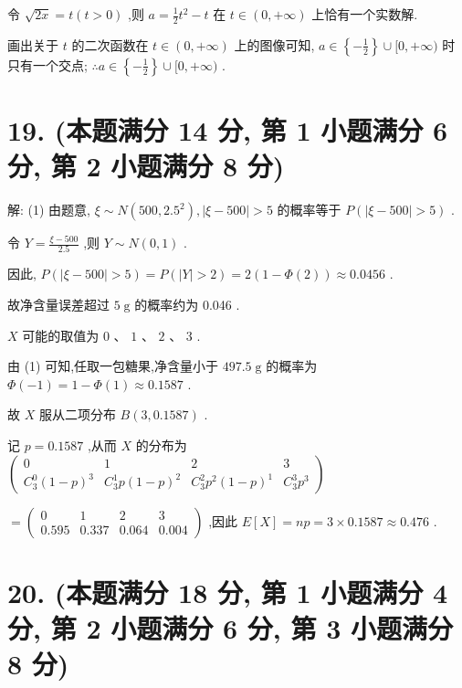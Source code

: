 \documentclass[10pt]{article}
\begin{document}
令 \(\sqrt{2x} = t\left( {t > 0}\right)\) ,则 \(a = \frac{1}{2}{t}^{2} - t\) 在 \(t \in  \left( {0, + \infty }\right)\) 上恰有一个实数解.

画出关于 \(t\) 的二次函数在 \(t \in  \left( {0, + \infty }\right)\) 上的图像可知, \(a \in  \left\{  {-\frac{1}{2}}\right\}   \cup  \lbrack 0, + \infty )\) 时只有一个交点; \(\therefore a \in  \left\{  {-\frac{1}{2}}\right\}   \cup  \lbrack 0, + \infty )\) .

\section*{19. (本题满分 14 分, 第 1 小题满分 6 分, 第 2 小题满分 8 分)}

解: (1) 由题意, \(\xi  \sim  N\left( {{500},{2.5}^{2}}\right) ,\left| {\xi  - {500}}\right|  > 5\) 的概率等于 \(P\left( {\left| {\xi  - {500}}\right|  > 5}\right)\) .

令 \(Y = \frac{\xi  - {500}}{2.5}\) ,则 \(Y \sim  N\left( {0,1}\right)\) .

因此, \(P\left( {\left| {\xi  - {500}}\right|  > 5}\right)  = P\left( {\left| Y\right|  > 2}\right)  = 2\left( {1 - \Phi \left( 2\right) }\right)  \approx  {0.0456}\) .

故净含量误差超过 \(5\mathrm{\;g}\) 的概率约为 0.046 .

\(X\) 可能的取值为 \(0\text{ 、 }1\text{ 、 }2\text{ 、 }3\) .

由 (1) 可知,任取一包糖果,净含量小于 \({497.5}\mathrm{\;g}\) 的概率为 \(\Phi \left( {-1}\right)  = 1 - \Phi \left( 1\right)  \approx  {0.1587}\) .

故 \(X\) 服从二项分布 \(B\left( {3,{0.1587}}\right)\) .

记 \(p = {0.1587}\) ,从而 \(X\) 的分布为 \(\left( \begin{matrix} 0 & 1 & 2 & 3 \\  {C}_{3}^{0}{\left( 1 - p\right) }^{3} & {C}_{3}^{1}p{\left( 1 - p\right) }^{2} & {C}_{3}^{2}{p}^{2}{\left( 1 - p\right) }^{1} & {C}_{3}^{3}{p}^{3} \end{matrix}\right)\)

\(= \left( \begin{matrix} 0 & 1 & 2 & 3 \\  {0.595} & {0.337} & {0.064} & {0.004} \end{matrix}\right)\) ,因此 \(E\left\lbrack  X\right\rbrack   = {np} = 3 \times  {0.1587} \approx  {0.476}\) .

\section*{20. (本题满分 18 分, 第 1 小题满分 4 分, 第 2 小题满分 6 分, 第 3 小题满分 8 分)}
\end{document}
